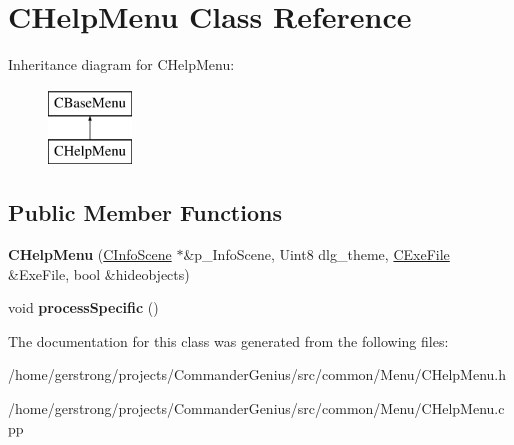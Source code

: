 \hypertarget{class_c_help_menu}{
\section{CHelpMenu Class Reference}
\label{class_c_help_menu}
}
Inheritance diagram for CHelpMenu:\begin{figure}[H]
\begin{center}
\leavevmode
\includegraphics[height=2cm]{class_c_help_menu}
\end{center}
\end{figure}
\subsection*{Public Member Functions}
\begin{DoxyCompactItemize}
\item 
\hypertarget{class_c_help_menu_a1a7af8a2ab5dcd8a587f728b0a4f19af}{
{\bfseries CHelpMenu} (\hyperlink{class_c_info_scene}{CInfoScene} $\ast$\&p\_\-InfoScene, Uint8 dlg\_\-theme, \hyperlink{class_c_exe_file}{CExeFile} \&ExeFile, bool \&hideobjects)}
\label{class_c_help_menu_a1a7af8a2ab5dcd8a587f728b0a4f19af}

\item 
\hypertarget{class_c_help_menu_ac0b8ec102c0ebdc71f03ff5688ea6982}{
void {\bfseries processSpecific} ()}
\label{class_c_help_menu_ac0b8ec102c0ebdc71f03ff5688ea6982}

\end{DoxyCompactItemize}


The documentation for this class was generated from the following files:\begin{DoxyCompactItemize}
\item 
/home/gerstrong/projects/CommanderGenius/src/common/Menu/CHelpMenu.h\item 
/home/gerstrong/projects/CommanderGenius/src/common/Menu/CHelpMenu.cpp\end{DoxyCompactItemize}
